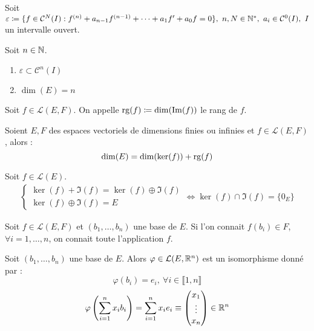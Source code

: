 Soit $\varepsilon \coloneqq \{ f \in \mathcal{C}^N(I) : f^{(n)} + a_{n - 1} f^{(n - 1)} + \cdots + a_1 f' + a_0 f = 0 \},\ n, N \in \mathbb{N}^*,\ a_i \in \mathcal{C}^0(I),\ I$ un intervalle ouvert.

\begin{proposition}
    Soit $n \in \mathbb{N}$.
    \begin{multicols}{2}
        \begin{enumerate}
            \item $\varepsilon \subset \mathcal{C}^n(I)$
            \item $\dim(E) = n$
        \end{enumerate}
    \end{multicols}
\end{proposition}

\begin{definition}
    Soit $f \in \mathcal{L}(E, F)$. On appelle $\operatorname{rg}(f) \coloneqq \dim(\Im(f))$ le rang de $f$.
\end{definition}

\begin{theorem}
    Soient $E, F$ des espaces vectoriels de dimensions finies ou infinies et $f \in \mathcal{L}(E, F)$, alors :
    \[ \dim(E) = \dim(\ker(f)) + \operatorname{rg}(f) \]
\end{theorem}

\begin{corollary}
    Soit $f \in \mathcal{L}(E)$.
    \begin{align*}
        \begin{cases}
            \ker(f) + \Im(f) = \ker(f) \oplus \Im(f) \\
            \ker(f) \oplus \Im(f) = E
        \end{cases}
        \iff 
        \ker(f) \cap \Im(f) = \{0_E\}
    \end{align*}
\end{corollary}

\begin{proposition}
    Soit $f \in \mathcal{L}(E, F)$ et $(b_1, \ldots, b_n)$ une base de $E$. Si l'on connait $f(b_i) \in F$, $\forall i = 1, \ldots, n$, on connait toute l'application $f$.
\end{proposition}

\begin{corollary}
    Soit $(b_1, \ldots, b_n)$ une base de $E$. Alors $\varphi \in \mathcal{L}(E, \mathbb{R}^n)$ est un isomorphisme donné par :
    \[ \varphi(b_i) = e_i,\ \forall i \in \llbracket 1, n \rrbracket \]
    \[ \varphi \left( \sum_{i = 1}^{n} x_i b_i \right) = \sum_{i = 1}^{n} x_i e_i \equiv 
    \begin{pmatrix}
        x_1 \\
        \vdots \\
        x_n
    \end{pmatrix}
    \in \mathbb{R}^n
     \]
\end{corollary}

